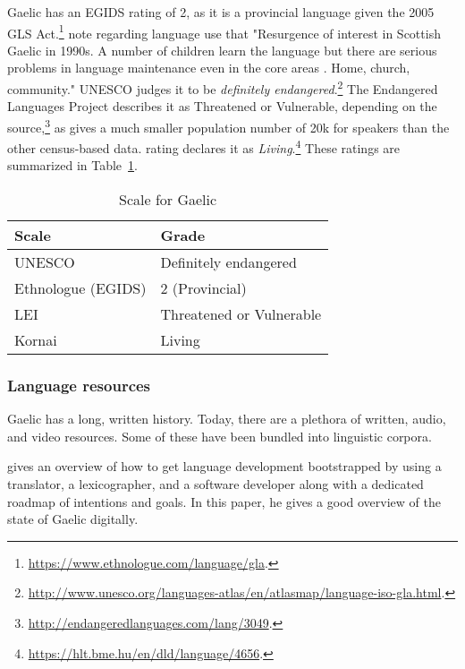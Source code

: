 Gaelic has an EGIDS rating of 2, as it is a provincial language given the 2005 GLS Act.\footnote{\href{https://www.ethnologue.com/language/gla}{https://www.ethnologue.com/language/gla}. }  \citet{lewis2009ethnologue} note regarding language use that "Resurgence of interest in Scottish Gaelic in 1990s. A number of children learn the language but there are serious problems in language maintenance even in the core areas \citep{salminen2007endangered}. Home, church, community." UNESCO judges it to be {\it definitely endangered}.\footnote{\href{http://www.unesco.org/languages-atlas/en/atlasmap/language-iso-gla.html}{http://www.unesco.org/languages-atlas/en/atlasmap/language-iso-gla.html}. } The Endangered Languages Project describes it as Threatened or Vulnerable, depending on the source,\footnote{\href{http://endangeredlanguages.com/lang/3049}{http://endangeredlanguages.com/lang/3049}. } as \citet{salminen2007europe} gives a much smaller population number of 20k for speakers than the other census-based data.  rating declares it as {\it Living}.\footnote{\href{https://hlt.bme.hu/en/dld/language/4656}{https://hlt.bme.hu/en/dld/language/4656}. } These ratings are summarized in Table~\ref{table:gaelic}.

\begin{table}
\centering
\begin{tabular}{|p{5cm}|p{5cm}|} \hline
{\bf Scale} & {\bf Grade} \\ \hline
UNESCO & Definitely endangered\\ \hline
Ethnologue (EGIDS) & 2 (Provincial) \\ \hline
LEI & Threatened or Vulnerable \\ \hline
Kornai & Living \\ \hline
\end{tabular}
\caption{Scale for Gaelic}
\label{table:gaelic}
\end{table}

\subsubsection{Language resources}
\label{subsec:gaelic-resources}

Gaelic has a long, written history. Today, there are a plethora of written, audio, and video resources. Some of these have been bundled into linguistic corpora.

\citet{bauer2014salt} gives an overview of how to get language development bootstrapped by using a translator, a lexicographer, and a software developer along with a dedicated roadmap of intentions and goals. In this paper, he gives a good overview of the state of Gaelic digitally.

